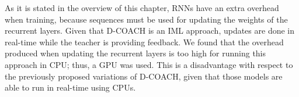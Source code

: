 As it is stated in the overview of this chapter, RNNs have an extra overhead when training, because sequences must be used for updating the weights of the recurrent layers. Given that D-COACH is an IML approach, updates are done in real-time while the teacher is providing feedback. We found that the overhead produced when updating the recurrent layers is too high for running this approach in CPU; thus, a GPU was used. This is a disadvantage with respect to the previously proposed variations of D-COACH, given that those models are able to run in real-time using CPUs. 